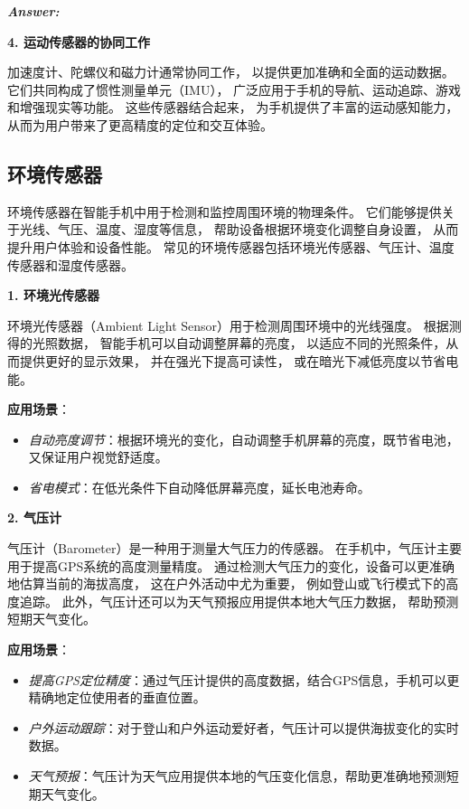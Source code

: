 \documentclass[12pt]{article}
\newenvironment{Answer}{
  \vspace{12pt}
  {\large\textbf{\textit{\hspace{-12pt}Answer:}}}\par
  \vspace{8pt}
} {\vspace{24pt}}
\begin{document}
\begin{Answer}
\noindent\textbf{4. 运动传感器的协同工作}\noindent

加速度计、陀螺仪和磁力计通常协同工作，
以提供更加准确和全面的运动数据。
它们共同构成了惯性测量单元（IMU），
广泛应用于手机的导航、运动追踪、游戏和增强现实等功能。
这些传感器结合起来，
为手机提供了丰富的运动感知能力，
从而为用户带来了更高精度的定位和交互体验。

\subsection*{环境传感器}\noindent

环境传感器在智能手机中用于检测和监控周围环境的物理条件。
它们能够提供关于光线、气压、温度、湿度等信息，
帮助设备根据环境变化调整自身设置，
从而提升用户体验和设备性能。
常见的环境传感器包括环境光传感器、气压计、温度传感器和湿度传感器。

\noindent\textbf{1. 环境光传感器}\noindent

环境光传感器（Ambient Light Sensor）用于检测周围环境中的光线强度。
根据测得的光照数据，
智能手机可以自动调整屏幕的亮度，
以适应不同的光照条件，从而提供更好的显示效果，
并在强光下提高可读性，
或在暗光下减低亮度以节省电能。

\textbf{应用场景}：
\begin{itemize}
    \item \textit{自动亮度调节}：根据环境光的变化，自动调整手机屏幕的亮度，既节省电池，又保证用户视觉舒适度。
    \item \textit{省电模式}：在低光条件下自动降低屏幕亮度，延长电池寿命。
\end{itemize}

\noindent\textbf{2. 气压计}\noindent

气压计（Barometer）是一种用于测量大气压力的传感器。
在手机中，气压计主要用于提高GPS系统的高度测量精度。
通过检测大气压力的变化，设备可以更准确地估算当前的海拔高度，
这在户外活动中尤为重要，
例如登山或飞行模式下的高度追踪。
此外，气压计还可以为天气预报应用提供本地大气压力数据，
帮助预测短期天气变化。

\textbf{应用场景}：
\begin{itemize}
    \item \textit{提高GPS定位精度}：通过气压计提供的高度数据，结合GPS信息，手机可以更精确地定位使用者的垂直位置。
    \item \textit{户外运动跟踪}：对于登山和户外运动爱好者，气压计可以提供海拔变化的实时数据。
    \item \textit{天气预报}：气压计为天气应用提供本地的气压变化信息，帮助更准确地预测短期天气变化。
\end{itemize}


\end{Answer}
\end{document}
